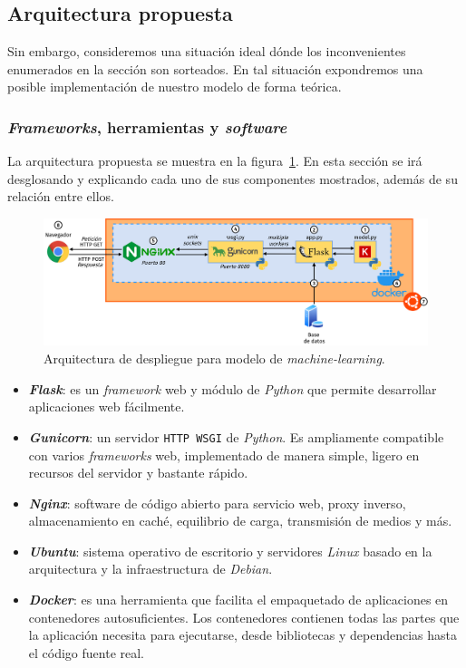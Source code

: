 \documentclass[a4paper,12pt]{article}
\begin{document}
		\subsection{Arquitectura propuesta}\label{section:architectureai}
				
		Sin embargo, consideremos una situación ideal dónde los inconvenientes enumerados en la sección \label{problems} son sorteados. En tal situación expondremos una posible implementación de nuestro modelo de forma teórica.
				
		\subsubsection{\textit{Frameworks}, herramientas y \textit{software}}
				
		La arquitectura propuesta se muestra en la figura~\ref{fig:en_fsi}. En esta sección se irá desglosando y explicando cada uno de sus componentes mostrados, además de su relación entre ellos.\citep{Chinchure2020May}
				
		\begin{figure}[H]
			\begin{center}
				\includegraphics[width=1\textwidth]{deploy_model.png}
				\caption{Arquitectura de despliegue para modelo de \textit{machine-learning}.}
				\label{fig:en_fsi}
			\end{center}
		\end{figure}
				
		\begin{itemize}
			\item \textit{\textbf{Flask}}: es un \textit{framework} web y módulo de \textit{Python} que permite desarrollar aplicaciones web fácilmente. \citep{flask}
			\item \textit{\textbf{Gunicorn}}: un servidor \texttt{HTTP WSGI} de \textit{Python}. Es ampliamente compatible con varios \textit{frameworks} web, implementado de manera simple, ligero en recursos del servidor y bastante rápido. \citep{gunicorn}
			\item \textit{\textbf{Nginx}}: software de código abierto para servicio web, proxy inverso, almacenamiento en caché, equilibrio de carga, transmisión de medios y más. \citep{nginx}
			\item \textit{\textbf{Ubuntu}}: sistema operativo de escritorio y servidores \textit{Linux} basado en la arquitectura y la infraestructura de \textit{Debian}. \citep{ubuntu}
			\item \textit{\textbf{Docker}}: es una herramienta que facilita el empaquetado de aplicaciones en contenedores autosuficientes. Los contenedores contienen todas las partes que la aplicación necesita para ejecutarse, desde bibliotecas y dependencias hasta el código fuente real. \citep{docker}
		\end{itemize}
				
\end{document}
